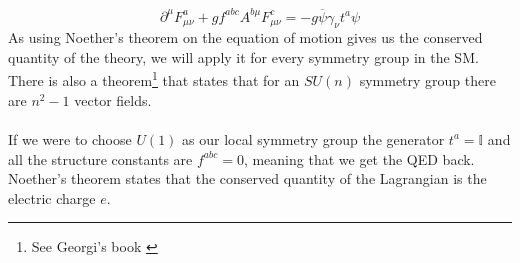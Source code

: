 \documentclass[12pt, a4paper]{book}
\begin{document}
\begin{equation}\label{eq:YM_eq}
    \partial^\mu F^a_{\mu\nu} +gf^{abc}A^{b\mu}F^c_{\mu\nu} = -g\overline{\psi}\gamma_\nu t^a\psi
\end{equation}
As using Noether's theorem on the equation of motion gives us the conserved quantity of the theory, we will apply it for every symmetry group in the SM. There is also a theorem\footnote{See Georgi's book \cite{Georgi:1982jb}} that states that for an $SU(n)$ symmetry group there are $n^2-1$ vector fields.\\
\\If we were to choose $U(1)$ as our local symmetry group the generator $t^a = \mathbb{I}$ and all the structure constants are $f^{abc}=0$, meaning that we get the QED back. 
Noether's theorem states that the conserved quantity of the Lagrangian is the electric charge $e$.

\clearpage
\end{document}
